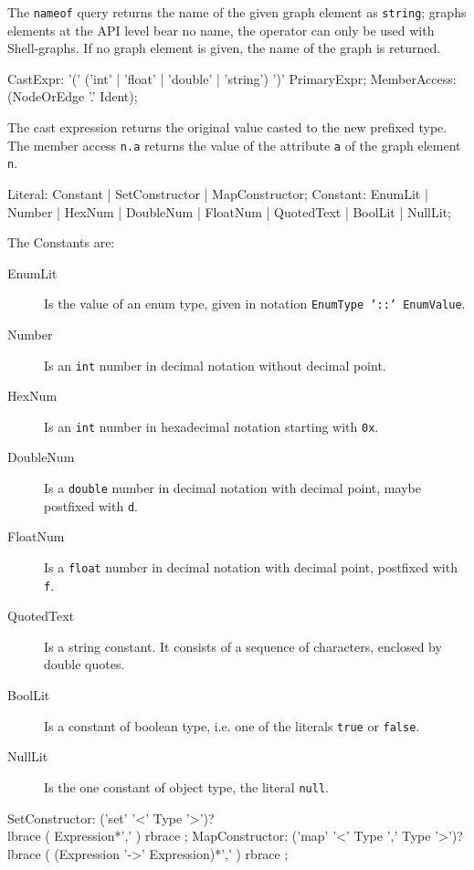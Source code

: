 The \texttt{nameof} query returns the name of the given graph element as \texttt{string}; 
graphs elements at the API level bear no name, the operator can only be used with Shell-graphs.
If no graph element is given, the name of the graph is returned.

\begin{rail} 
  CastExpr: '(' ('int' | 'float' | 'double' | 'string') ')' PrimaryExpr;
  MemberAccess: (NodeOrEdge '.' Ident);
\end{rail}

The cast expression returns the original value casted to the new prefixed type.
The member access \texttt{n.a} returns the value of the attribute \texttt{a} of the graph element \texttt{n}.

\begin{rail} 
  Literal: Constant | SetConstructor | MapConstructor;
  Constant: EnumLit | Number | HexNum | DoubleNum | FloatNum | QuotedText | BoolLit | NullLit;
\end{rail}

The Constants are:
\begin{description}
  \item[EnumLit] Is the value of an enum type, given in notation \texttt{EnumType '::' EnumValue}.
  \item[Number] Is an \texttt{int} number in decimal notation without decimal point.
  \item[HexNum] Is an \texttt{int} number in hexadecimal notation starting with \texttt{0x}.
  \item[DoubleNum] Is a \texttt{double} number in decimal notation with decimal point, maybe postfixed with \texttt{d}.
  \item[FloatNum] Is a \texttt{float} number in decimal notation with decimal point, postfixed with \texttt{f}.
  \item[QuotedText] Is a string constant. It consists of a sequence of characters, enclosed by double quotes.
  \item[BoolLit] Is a constant of boolean type, i.e. one of the literals \texttt{true} or \texttt{false}.
  \item[NullLit] Is the one constant of object type, the literal \texttt{null}.
\end{description}

\begin{rail} 
  SetConstructor: ('set' '<' Type '>')? \\ lbrace ( Expression*',' ) rbrace ;
  MapConstructor: ('map' '<' Type ',' Type '>')? \\ lbrace ( (Expression '->' Expression)*',' ) rbrace ;
\end{rail}

